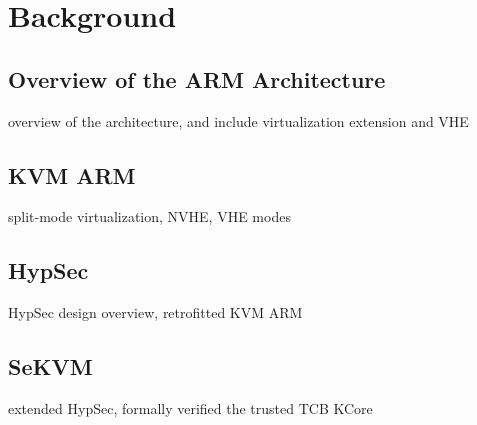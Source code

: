 
\chapter{Background}
\label{sec:bg}

\section{Overview of the ARM Architecture}

overview of the architecture, and include virtualization extension and VHE

\section{KVM ARM}

split-mode virtualization, NVHE, VHE modes

\section{HypSec}

HypSec design overview, retrofitted KVM ARM

\section{SeKVM}
\label{sec:sekvmintro}

extended HypSec, formally verified the trusted TCB KCore





